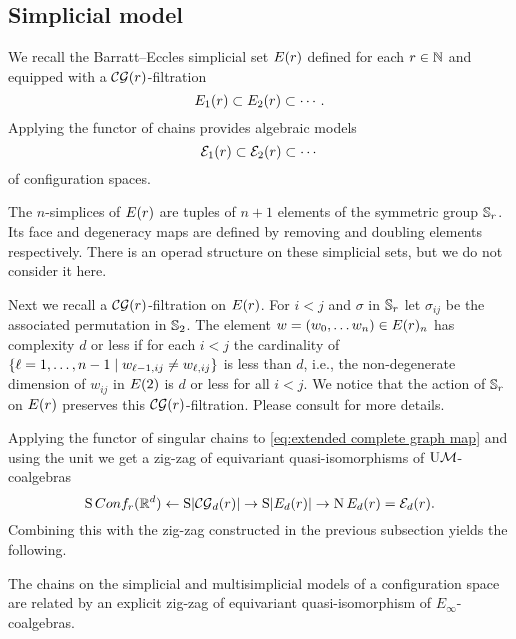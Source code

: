 \subsection{Simplicial model}\label{ss:simplicial model}

We recall the Barratt--Eccles simplicial set $E(r)$ defined for each $r\in\mathbb{N}$ and equipped with a $\mathcal{CG}(r)$-filtration
\[
E_{1}(r) \subset E_{2}(r) \subset \dotsb.
\]
Applying the functor of chains provides algebraic models
\[
\mathcal{E}_{1}(r) \subset \mathcal{E}_{2}(r) \subset \dotsb
\]
of configuration spaces.

The $n$-simplices of $E(r)$ are tuples of $n+1$ elements of the symmetric group $\mathbb{S}_r$.
Its face and degeneracy maps are defined by removing and doubling elements respectively.
There is an operad structure on these simplicial sets, but we do not consider it here.

Next we recall a $\mathcal{CG}(r)$-filtration on $E(r)$.
For $i<j$ and $\sigma$ in $\mathbb{S}_r$ let $\sigma_{ij}$ be the associated permutation in $\mathbb{S}_2$.
The element $w = (w_0,\dots w_n) \in E(r)_n$ has complexity $d$ or less if for each $i<j$
the cardinality of $\{\ell=1,\dots,n-1 \mid w_{\ell-1,ij} \neq w_{\ell,ij}\}$ is less than $d$, i.e., the non-degenerate dimension of $w_{ij}$ in $E(2)$ is $d$ or less for all $i<j$.
We notice that the action of $\mathbb{S}_r$ on $E(r)$ preserves this $\mathcal{CG}(r)$-filtration.
Please consult \cite{smith1989filtration,kashiwabara1993confcomplex,berger1997confspacemodel} for more details.

Applying the functor of singular chains to \cref{eq:extended complete graph map} and using the unit we get a zig-zag of equivariant quasi-isomorphisms of $\mathrm{U}\mathcal{M}$-coalgebras
\begin{equation}\label{eq:simplicial zig-zag}
	\operatorname{S}Conf_{r}(\mathbb{R}^{d}) \leftarrow
	\operatorname{S}\lvert\mathcal{CG}_d(r)\rvert \to
	\operatorname{S}\lvert E_d(r)\rvert \to
	\operatorname{N} E_d(r)= \mathcal{E}_d(r).
\end{equation}
Combining this with the zig-zag constructed in the previous subsection yields the following.

\begin{theorem}
	The chains on the simplicial and multisimplicial models of a configuration space are related by an explicit zig-zag of equivariant quasi-isomorphism of $E_\infty$-coalgebras.
\end{theorem}